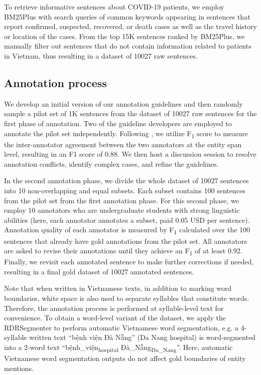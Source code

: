 \documentclass[11pt]{article}
\begin{document}
To retrieve informative sentences about COVID-19 patients, we employ BM25Plus \cite{trotman2014improvements} with search queries of common keywords appearing in sentences that report confirmed, suspected, recovered, or death cases as well as the travel history or location of the cases. From the top 15K sentences ranked by BM25Plus, we manually filter out sentences that do not contain information related to patients in Vietnam, thus resulting in a dataset of 10027 raw sentences. 





\subsection{Annotation process}


We develop an initial version of our annotation guidelines and then randomly sample a pilot set of 1K sentences from the dataset of 10027 raw sentences for the first phase of annotation. Two of the guideline developers are employed to annotate the pilot set independently. Following , we utilize F\textsubscript{1} score to measure the inter-annotator agreement between the two annotators at the entity span level, resulting in an F1 score of 0.88.  We then host a discussion session to resolve annotation conflicts, identify complex cases, and refine the guidelines. 

In the second annotation phase, we divide the whole dataset of 10027 sentences into 10 non-overlapping and equal subsets. Each subset contains 100 sentences from the pilot set from the first annotation phase. For this second phase, we employ 10 annotators who are undergraduate students with strong linguistic abilities (here, each annotator annotates a subset, paid 0.05 USD per sentence). Annotation quality of each annotator is measured by F\textsubscript{1} calculated over the 100 sentences that already have gold annotations  from the pilot set. All annotators are asked to revise their annotations until they achieve an  F\textsubscript{1} of at least 0.92. Finally, we revisit each annotated sentence to make further corrections if needed, resulting in a final gold dataset of 10027 annotated sentences.

Note that when written in Vietnamese texts, in addition to marking word boundaries, white space is also used to separate syllables that constitute words. Therefore, the annotation process is performed at syllable-level text for convenience. 
To obtain a word-level variant of the dataset, we apply the  RDRSegmenter to perform automatic Vietnamese word segmentation, e.g. a 4-syllable written text ``bệnh viện Đà Nẵng'' (Da Nang hospital) is word-segmented into a 2-word text ``bệnh\_viện\textsubscript{hospital} Đà\_Nẵng\textsubscript{Da\_Nang}''. Here, automatic Vietnamese word segmentation outputs do not affect gold boundaries of entity mentions.
\end{document}
